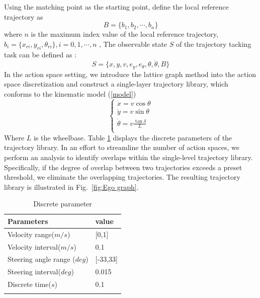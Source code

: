 \documentclass[sn-mathphys]{sn-jnl}%
\theoremstyle{thmstyleone}%
\theoremstyle{thmstyletwo}%
\theoremstyle{thmstylethree}%
\begin{document}
Using the matching point as the starting point, define the local reference trajectory as
\begin{equation}
B=\{b_1,b_2, \cdots,b_n\}
\end{equation}
where $ n $ is the maximum index value of the local reference trajectory,$ b_i=\{x_{ri},y_{ri},\theta_{ri}\},i=0,1,\cdots,n$ ,
The observable state $ S $  of the trajectory tacking task can be defined as :
\begin{equation}
S=\{x,y,v,e_y,e_{\theta},\theta,\dot{\theta},B \}
\end{equation}
In the action space setting, we introduce the lattice graph method into the action space discretization and construct a single-layer trajectory library, which conforms to the kinematic model (\ref{model})
\begin{equation}\label{model}
\begin{cases}
\dot{x}=v\cos\theta \\
\dot{y}=v\sin\theta \\
\dot{\theta}=v\frac{\tan \delta }{L} \\
\end{cases}
\end{equation}
Where $ L $ is the wheelbase. Table \ref{tab1} displays the discrete parameters of the trajectory library. In an effort to streamline the number of action spaces, we perform an analysis to identify overlaps within the single-level trajectory library. Specifically, if the degree of overlap between two trajectories exceeds a preset threshold, we eliminate the overlapping trajectories. The resulting trajectory library is illustrated in Fig.~\ref{fig:Ego graph}.

\begin{table}[h]
	\begin{center}
		\begin{minipage}{174pt}
			\caption{Discrete parameter}\label{tab1}%
			\begin{tabular}{@{}ll@{}}
				\toprule
				Parameters & value   \\
				\midrule
				Velocity range($ m/s $)   & [0,1]      \\
				Velocity interval($ m/s $)  & 0.1         \\
				Steering angle range ($ deg $)   & [-33,33]     \\
				Steering interval($ deg $)  & 0.015 \\
				Discrete time($ s $)   &  0.1 \\
				\botrule
			\end{tabular}
			
		\end{minipage}
	\end{center}
\end{table}
\end{document}
